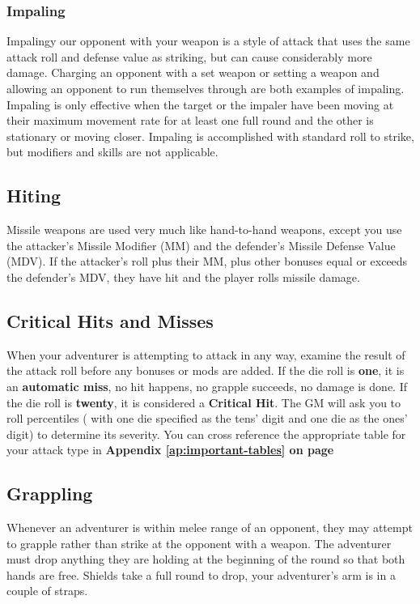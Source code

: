 \begin{multicols*}{2}
\subsubsection{Impaling}
Impalingy our opponent with your weapon is a style of attack that uses the same attack roll and defense value as striking, but can cause considerably more damage. Charging an opponent with a set weapon or setting a weapon and allowing an opponent to run themselves through are both examples of impaling. Impaling is only effective when the target or the impaler have been moving at their maximum movement rate for at least one full round and the other is stationary or moving closer. Impaling is accomplished with  standard roll to strike, but modifiers and skills are not applicable.
\subsection{Hiting}
Missile weapons are used very much like hand-to-hand weapons, except you use the attacker's Missile Modifier (MM) and the defender's Missile Defense Value (MDV). If the attacker's  roll plus their MM, plus other bonuses equal or exceeds the defender's MDV, they have hit and the player rolls missile damage.
\subsection{Critical Hits and Misses}
When your adventurer is attempting to attack in any way, examine the result of the attack roll before any bonuses or mods are added. If the die roll is \textbf{one}, it is an \textbf{automatic miss}, no hit happens, no grapple succeeds, no damage is
done. If the die roll is \textbf{twenty}, it is considered a \textbf{Critical Hit}. The GM will ask you to roll percentiles ( with one die specified as the tens' digit and one die as the ones' digit) to determine its severity. You can cross reference the appropriate table for your attack type in \textbf{Appendix \ref{ap:important-tables} on page \pageref{critical-hits}}
\subsection{Grappling}
Whenever an adventurer is within melee range of an opponent, they may attempt to grapple rather than strike at the opponent with a weapon. The adventurer must drop anything they are holding at the beginning of the round so that both hands are free. Shields take a full round to drop, your adventurer's arm is in a couple of straps.


\end{multicols*}
